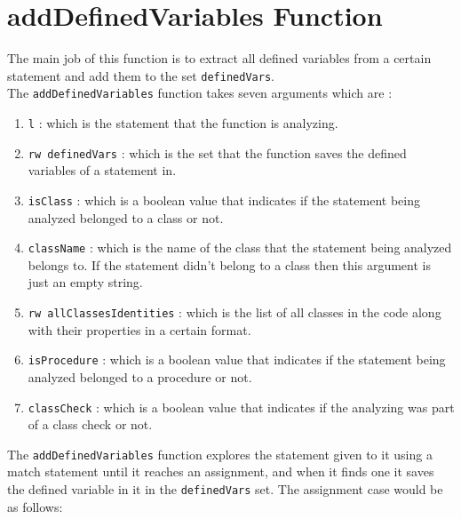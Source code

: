 \documentclass[11pt]{report}
\begin{document}
\section{addDefinedVariables Function}

The main job of this function is to extract all defined variables from a certain statement and add them to the set \texttt{definedVars}.
\\

The \texttt{addDefinedVariables} function takes seven arguments which are :

\begin{enumerate}
\item \texttt{l} : which is the statement that the function is analyzing.

\item \texttt{rw definedVars} : which is the set that the function saves the defined variables of a statement in.

\item \texttt{isClass} : which is a boolean value that indicates if the statement being analyzed belonged to a class or not.

\item \texttt{className} : which is the name of the class that the statement being analyzed belongs to. If the statement didn't belong to a class then this argument is just an empty string. 

\item \texttt{rw allClassesIdentities} : which is the list of all classes in the code along with their properties in a certain format.

\item \texttt{isProcedure} : which is a boolean value that indicates if the statement being analyzed belonged to a procedure or not.

\item  \texttt{classCheck} : which is a boolean value that indicates if the analyzing was part of a class check or not.
\end{enumerate}

The \texttt{addDefinedVariables} function explores the statement given to it using a match statement until it reaches an assignment, and when it finds one it saves the defined variable in it in the \texttt{definedVars} set. The assignment case would be as follows: 
\end{document}
